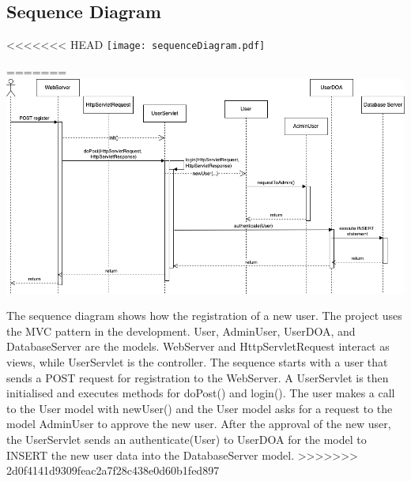 \subsection{Sequence Diagram}

<<<<<<< HEAD
\texttt{[image: sequenceDiagram.pdf]}

=======
\includegraphics[]{images/sequenceDiagram.png}


The sequence diagram shows how the registration of a new user.
The project uses the MVC pattern in the development.
User, AdminUser, UserDOA, and DatabaseServer are the models.
WebServer and HttpServletRequest interact as views, while UserServlet is the controller.
The sequence starts with a user that sends a POST request for registration to the WebServer.
A UserServlet is then initialised and executes methods for doPost() and login().
The user makes a call to the User model with newUser() and the User model asks for a request to the model AdminUser to approve the new user.
After the approval of the new user, the UserServlet sends an authenticate(User) to UserDOA for the model to INSERT the new user data into the DatabaseServer model.
>>>>>>> 2d0f4141d9309feac2a7f28c438e0d60b1fed897
